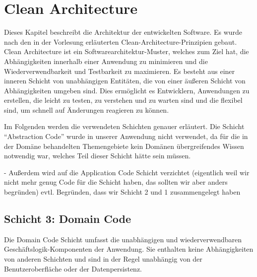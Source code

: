 \chapter{Clean Architecture}

Dieses Kapitel beschreibt die Architektur der entwickelten Software. Es wurde nach den in der Vorlesung erläuterten Clean-Architecture-Prinzipien gebaut. Clean Architecture ist ein Softwarearchitektur-Muster, welches zum Ziel hat, die Abhängigkeiten innerhalb einer Anwendung zu minimieren und die Wiederverwendbarkeit und Testbarkeit zu maximieren. Es besteht aus einer inneren Schicht von unabhängigen Entitäten, die von einer äußeren Schicht von Abhängigkeiten umgeben sind. Dies ermöglicht es Entwicklern, Anwendungen zu erstellen, die leicht zu testen, zu verstehen und zu warten sind und die flexibel sind, um schnell auf Änderungen reagieren zu können.

Im Folgenden werden die verwendeten Schichten genauer erläutert. Die Schicht \enquote{Abstraction Code} wurde in unserer Anwendung nicht verwendet, da für die in der Domäne behandelten Themengebiete kein Domänen übergreifendes Wissen notwendig war, welches Teil dieser Schicht hätte sein müssen. 

- Außerdem wird auf die Application Code Schicht verzichtet (eigentlich weil wir nicht mehr genug Code für die Schicht haben, das sollten wir aber anders begründen) evtl. Begründen, dass wir Schicht 2 und 1 zusammengelegt haben

\section{Schicht 3: Domain Code}
Die Domain Code Schicht umfasst die unabhängigen und wiederverwendbaren Geschäftslogik-Komponenten der Anwendung. Sie enthalten keine Abhängigkeiten von anderen Schichten und sind in der Regel unabhängig von der Benutzeroberfläche oder der Datenpersistenz.


